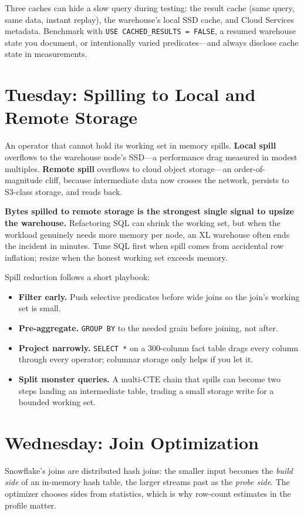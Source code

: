 \begin{notebox}
Three caches can hide a slow query during testing: the result cache (same query, same data, instant replay), the warehouse's local SSD cache, and Cloud Services metadata. Benchmark with \texttt{USE CACHED\_RESULTS = FALSE}, a resumed warehouse state you document, or intentionally varied predicates---and always disclose cache state in measurements.
\end{notebox}

\section{Tuesday: Spilling to Local and Remote Storage}
An operator that cannot hold its working set in memory spills. \textbf{Local spill} overflows to the warehouse node's SSD---a performance drag measured in modest multiples. \textbf{Remote spill} overflows to cloud object storage---an order-of-magnitude cliff, because intermediate data now crosses the network, persists to S3-class storage, and reads back.

\begin{pitfall}
\textbf{Bytes spilled to remote storage is the strongest single signal to upsize the warehouse.} Refactoring SQL can shrink the working set, but when the workload genuinely needs more memory per node, an XL warehouse often ends the incident in minutes. Tune SQL first when spill comes from accidental row inflation; resize when the honest working set exceeds memory.
\end{pitfall}

Spill reduction follows a short playbook:
\begin{itemize}
    \item \textbf{Filter early.} Push selective predicates before wide joins so the join's working set is small.
    \item \textbf{Pre-aggregate.} \texttt{GROUP BY} to the needed grain before joining, not after.
    \item \textbf{Project narrowly.} \texttt{SELECT *} on a 300-column fact table drags every column through every operator; columnar storage only helps if you let it.
    \item \textbf{Split monster queries.} A multi-CTE chain that spills can become two steps landing an intermediate table, trading a small storage write for a bounded working set.
\end{itemize}

\section{Wednesday: Join Optimization}
Snowflake's joins are distributed hash joins: the smaller input becomes the \emph{build side} of an in-memory hash table, the larger streams past as the \emph{probe side}. The optimizer chooses sides from statistics, which is why row-count estimates in the profile matter.

